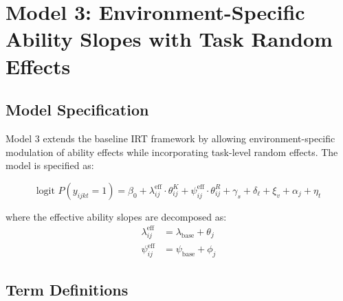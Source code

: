 \documentclass{article}
\begin{document}
\section{Model 3: Environment-Specific Ability Slopes with Task Random Effects}

\subsection{Model Specification}

Model 3 extends the baseline IRT framework by allowing environment-specific modulation of ability effects while incorporating task-level random effects. The model is specified as:

\begin{equation}
\text{logit } P(y_{ijkt} = 1) = \beta_0 + \lambda_{ij}^\text{eff} \cdot \theta_{ij}^K + \psi_{ij}^\text{eff} \cdot \theta_{ij}^R + \gamma_s + \delta_\ell + \xi_v + \alpha_j + \eta_t
\end{equation}

where the effective ability slopes are decomposed as:
\begin{align}
\lambda_{ij}^\text{eff} &= \lambda_\text{base} + \theta_j \\
\psi_{ij}^\text{eff} &= \psi_\text{base} + \phi_j
\end{align}

\subsection{Term Definitions}
\end{document}
